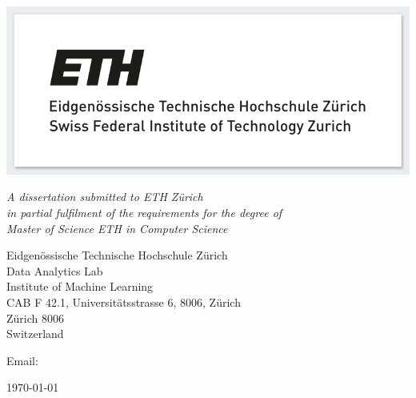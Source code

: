 \begin{titlepage} 

\begin{center}
\noindent
\huge
\dissertationtitle \\
\end{center}

\begin{center}
\noindent
\huge
\authorname \\
\Large
\authorcollege      \\[24pt]
\includegraphics{uni.jpg}
\end{center}

\vspace{24pt} 

\begin{center}
\noindent
\large
{\it A dissertation submitted to ETH Zürich \\ 
in partial fulfilment of the requirements for the degree of \\ 
Master of Science ETH in Computer Science} 
\end{center}

\begin{center}
\noindent
Eidgenössische Technische Hochschule Zürich \\
Data Analytics Lab     \\
Institute of Machine Learning  \\
CAB F 42.1, Universitätsstrasse 6, 8006, Zürich\\
Zürich 8006 \\
{\sc Switzerland}    \\
\end{center}

\begin{center}
\noindent
Email: \authoremail \\
\end{center}

\begin{center}
\noindent
\today
\end{center}

\end{titlepage} 

\newpage
\vspace*{\fill}
